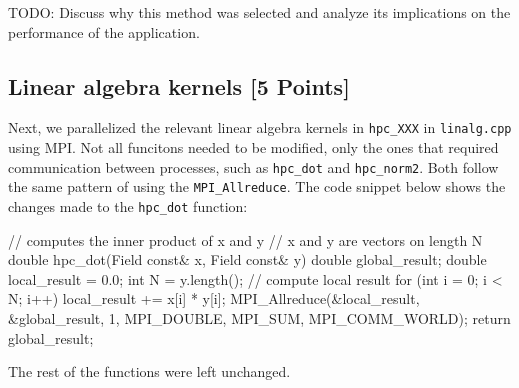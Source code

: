 \documentclass[unicode,11pt,a4paper,oneside,numbers=endperiod,openany]{scrartcl}
\begin{document}
TODO: Discuss why this method was selected and analyze its implications on the performance of the application.
\subsection{Linear algebra kernels [5 Points]}
Next, we parallelized the relevant linear algebra kernels in  \texttt{hpc\_XXX}
in \texttt{linalg.cpp} using MPI. Not all funcitons needed to be modified, only
the ones that required communication between processes, such as \texttt{hpc\_dot}
and \texttt{hpc\_norm2}. Both follow the same pattern of using the
\texttt{MPI\_Allreduce}. The code snippet below shows the changes made to the
\texttt{hpc\_dot} function:
\begin{cppverbatim}
// computes the inner product of x and y
// x and y are vectors on length N
double hpc_dot(Field const& x, Field const& y) {
    double global_result;
    double local_result = 0.0;
    int N = y.length();
    // compute local result
    for (int i = 0; i < N; i++) {
        local_result += x[i] * y[i];
    }
    MPI_Allreduce(&local_result, &global_result, 1, MPI_DOUBLE, MPI_SUM, MPI_COMM_WORLD);
    return global_result;
}
\end{cppverbatim}
The rest of the functions were left unchanged.
\end{document}
